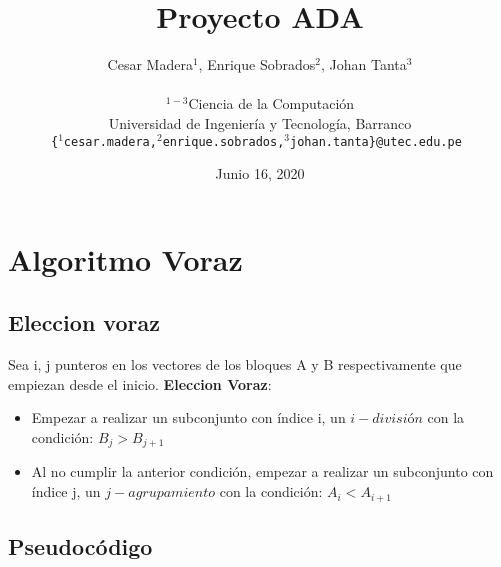 \documentclass{article}
\title{ \textbf{Proyecto ADA} }
\author{
Cesar Madera$^{1}$, Enrique Sobrados$^{2}$, Johan Tanta$^{3}$\\ \\
\small{$^{1-3}$Ciencia de la Computación}\\
\small{Universidad de Ingeniería y Tecnología, Barranco}\\
\small{\texttt{\{$^{1}$cesar.madera,$^{2}$enrique.sobrados,$^{3}$johan.tanta\}@utec.edu.pe } }
}
\date{\small{Junio 16, 2020}}
\begin{document}
\maketitle
\tableofcontents
\newpage


\section{Algoritmo Voraz}
\subsection{Eleccion voraz}
%
Sea i, j punteros en los vectores de los bloques A y B respectivamente que empiezan desde el inicio. \textbf{Eleccion Voraz}: 

\begin{itemize}
\item Empezar a realizar un subconjunto con índice i, un $i-división$ con la condición: $B_{j} > B_{j+1}$
\item Al no cumplir la anterior condición, empezar a realizar un subconjunto con índice j, un $j-agrupamiento$ con la condición:
$A_{i} < A_{i+1}$
\end{itemize}

\subsection{Pseudocódigo}
\end{document}
